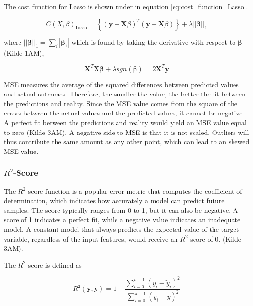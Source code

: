 \noindent The cost function for Lasso is shown under in equation \ref{eq:cost_function_Lasso}. 

\begin{equation}\label{eq:cost_function_Lasso}
    C(X,\beta)_\text{Lasso} =  \left\lbrace ( \textbf{y} - \textbf{X}\beta )^T (\textbf{y} - \textbf{X}\beta)\right\rbrace + \lambda||\boldsymbol{\beta}||_1  
\end{equation}

\noindent where $||\boldsymbol{\beta}||_1 = \sum_{i} |\boldsymbol{\beta_i}|$ which is found by taking the derivative with respect to $\boldsymbol{\beta}$ (Kilde 1AM), 

\begin{equation}\label{eq: optimal_lasso}
    \mathbf{X}^T\mathbf{X}\boldsymbol{\beta} + \lambda sgn(\boldsymbol{\beta}) = 2\mathbf{X}^T\boldsymbol{y} \label{eq: optimal_lasso}
\end{equation}

\noindent MSE measures the average of the squared differences between predicted values and actual outcomes. Therefore, the smaller the
value, the better the fit between the predictions and reality. Since the MSE value comes from the square of the errors between the actual
values and the predicted values, it cannot be negative. A perfect fit between the predictions and reality would yield an MSE value equal
to zero (Kilde 3AM). A negative side to MSE is that it is not scaled. Outliers will thus contribute the same amount as any other point,
which can lead to an skewed MSE value. 

\subsubsection{$R^2$-Score}

\noindent The $R^2$-score function is a popular error metric that computes the coefficient of determination, which indicates how
accurately a model can predict future samples. The score typically ranges from 0 to 1, but it can also be negative. A score of 1 indicates
a perfect fit, while a negative value indicates an inadequate model. A constant model that always predicts the expected value of the target
variable, regardless of the input features, would receive an $R^2$-score of 0. (Kilde 3AM).

\noindent The $R^2$-score is defined as 

\begin{equation}\label{eqR2} 
R^2(\boldsymbol{y}, \tilde{\boldsymbol{y}}) = 1 - \frac{\sum_{i=0}^{n - 1} (y_i - \tilde{y}_i)^2}{\sum_{i=0}^{n - 1} (y_i - \bar{y})^2}
\end{equation}

